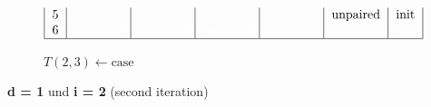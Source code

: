 \begin{figure}[H]
\begin{subfigure}[t]{0.65\textwidth}
\[\begin{tabular}{|c|c|c|c|c|c|c|}
                                    5     &          &                         &          &          & unpaired & init  \\
                                    6 & \textcolor{white}{unpaired} & \textcolor{white}{unpaired} & \textcolor{white}{unpaired}
                                    & \textcolor{white}{unpaired}
                                    & \textcolor{white}{unpaired}
                                    & \textcolor{white}{init}
                                    \\ \hline
                        \end{tabular}
        \]
        \caption{$T(2,3) \gets \text{case}$ }
    \end{subfigure}
    \caption{\textbf{d = 1} und \textbf{i = 2} (second iteration)}\label{fig:figure18}

\end{figure}



